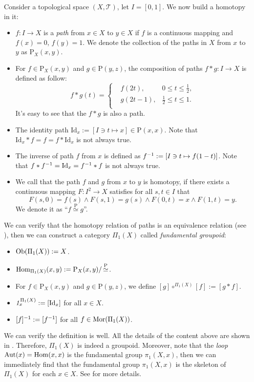 \documentclass{article}
\begin{document}
\begin{exm}
	Consider a topological space $(X,\mathcal{T})$, let $I=[0,1]$. We now build a homotopy in it:
	\begin{itemize}
		\item $f:I\to X$ is a \emph{path} from $x\in X$ to $y\in X$ if $f$ is a continuous mapping and $f(x)=0$, $f(y)=1$. We denote the collection of the paths in $X$ from $x$ to $y$ as $\mathrm{P}_X(x,y)$.
		\item For $f\in\mathrm{P}_X(x,y)$ and $g\in\mathrm{P}(y,z)$, the composition of paths $f*g:I\to X$ is defined as follow:
			$$f*g(t)=\left\{\begin{aligned}
				& f(2t),   & 0\leq t\leq\frac{1}{2},\\
				& g(2t-1), & \frac{1}{2}\leq t\leq1.\\
			\end{aligned}\right.$$
			It's easy to see that the $f*g$ is also a path.
		\item The identity path $\mathrm{Id}_x:=[I\ni t\mapsto x]\in\mathrm{P}(x,x)$. Note that $\mathrm{Id}_x*f=f=f*\mathrm{Id}_x$ is not always true.
		\item The inverse of path $f$ from $x$ is defined as $f^{-1}:=[I\ni t\mapsto f(1-t)]$. Note that $f*f^{-1}=\mathrm{Id}_x=f^{-1}*f$ is not always true.
		\item We call that the path $f$ and $g$ from $x$ to $y$ is homotopy, if there exists a continuous mapping $F:I^2\to X$ satisfies for all $s,t\in I$ that
			$$F(s,0)=f(s)\wedge F(s,1)=g(s)\wedge F(0,t)=x\wedge F(1,t)=y.$$
		We denote it as ``$f\mathop{\simeq}\limits^\mathrm{P}g$''.
	\end{itemize}
	
	We can verify that the homotopy relation of paths is an equivalence relation (see \cite[定理 10.1.1]{top-1}), then we can construct a category $\Pi_1(X)$ called \emph{fundamental groupoid}:
	\begin{itemize}
		\item $\mathrm{Ob}(\Pi_1(X)):=X$.
		\item $\mathrm{Hom}_{\Pi_1(X)}(x,y):=\mathrm{P}_X(x,y)/\mathop{\simeq}\limits^\mathrm{P}$.
		\item For $f\in\mathrm{P}_X(x,y)$ and $g\in\mathrm{P}(y,z)$, we define $[g]\circ^{\Pi_1(X)}[f]:=[g*f]$.
		\item $\mathit{1}^{\Pi_1(X)}_x:=[\mathrm{Id}_x]$ for all $x\in X$.
		\item $[f]^{-1}:=[f^{-1}]$ for all $f\in\mathrm{Mor}(\Pi_1(X))$.
	\end{itemize}
	We can verify the definition is well. All the details of the content above are shown in \cite[\S10.1]{top-1}. Therefore, $\Pi_1(X)$ is indeed a groupoid. Moreover, note that the \emph {loop} $\mathrm{Aut}(x)=\mathrm{Hom}(x,x)$ is the fundamental group $\pi_1(X,x)$, then we can immediately find that the fundamental group $\pi_1(X,x)$ is the skeleton of $\Pi_1(X)$ for each $x\in X$. See \cite[Chapter 2]{top-2} for more details.
\end{exm}
\end{document}
